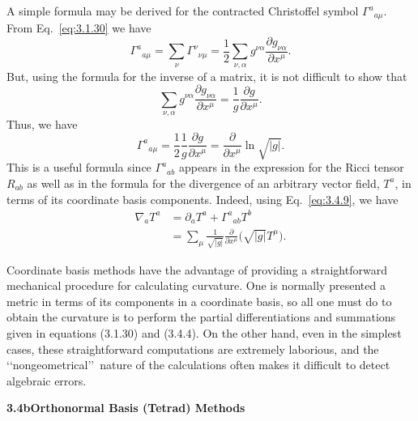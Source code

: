 A simple formula may be derived for the contracted Christoffel symbol $\Gamma^a{}_{a\mu}$. From
Eq.~\eqref{eq:3.1.30} we have
\begin{equation}
  \Gamma^a{}_{a\mu}
  =\sum_\nu\Gamma^\nu{}_{\nu\mu}
  =\frac{1}{2}\sum_{\nu,\alpha}g^{\nu\alpha}
  \frac{\partial g_{\nu\alpha}}{\partial x^\mu}.
  \tag{3.4.7}\label{eq:3.4.7}
\end{equation}
But, using the formula for the inverse of a matrix, it is not difficult to show that
\begin{equation}
  \sum_{\nu,\alpha}g^{\nu\alpha}\frac{\partial g_{\nu\alpha}}{\partial x^\mu}
  =\frac{1}{g}\frac{\partial g}{\partial x^\mu}.
  \tag{3.4.8}\label{eq:3.4.8}
\end{equation}
Thus, we have
\begin{equation}
  \Gamma^a{}_{a\mu}
  =\frac{1}{2}\frac{1}{g}\frac{\partial g}{\partial x^\mu}
  =\frac{\partial}{\partial x^\mu}\ln\sqrt{|g|}.
  \tag{3.4.9}\label{eq:3.4.9}
\end{equation}
This is a useful formula since $\Gamma^a{}_{ab}$ appears in the expression for the Ricci tensor $R_{ab}$
as well as in the formula for the divergence of an arbitrary vector field, $T^a$, in terms
of its coordinate basis components. Indeed, using Eq.~\eqref{eq:3.4.9}, we have
\begin{equation}
  \begin{aligned}
    \nabla_aT^a
    &=\partial_aT^a+\Gamma^a{}_{ab}T^b\\
    &=\sum_\mu\frac{1}{\sqrt{|g|}}\frac{\partial}{\partial x^\mu}
    \bigl(\sqrt{|g|}T^\mu\bigr).
  \end{aligned}
  \tag{3.4.10}\label{eq:3.4.10}
\end{equation}

Coordinate basis methods have the advantage of providing a straightforward
mechanical procedure for calculating curvature. One is normally presented a metric
in terms of its components in a coordinate basis, so all one must do to obtain the
curvature is to perform the partial differentiations and summations given in equations
(3.1.30) and (3.4.4). On the other hand, even in the simplest cases, these straightforward computations are extremely laborious, and the \lq\lq nongeometrical\rq\rq\ nature of
the calculations often makes it difficult to detect algebraic errors.

\medskip
\noindent\textbf{3.4b\quad Orthonormal Basis (Tetrad) Methods}

